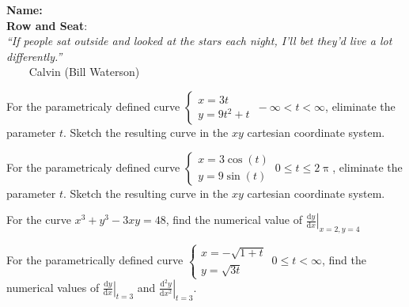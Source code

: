 \documentclass[12pt,fleqn]{exam}
\newcommand{\class}{MATH 202, Fall \the\year}
\begin{document}
\large
\noindent\makebox[3.0truein][l]{\textbf{\class}}
\textbf{Name:} \hrulefill \\
\noindent {}
\textbf{Row and Seat}:\hrulefill\\





\noindent \emph{“If people sat outside and looked at 
the stars each night, I’ll bet they’d live a lot differently.”}\\
  $\phantom{xxx}$ \hfill {\sc Calvin (Bill Waterson)}


\begin{questions} 
    
  
\question For the parametricaly defined curve $\begin{cases}
      x = 3 t \\ y = 9 t^2 + t \end{cases} \, -\infty < t < \infty$,
      eliminate the parameter $t$. Sketch the resulting curve in
      the $xy$ cartesian coordinate system.

\begin{solution}[2.5in]
\end{solution}

\question For the parametricaly defined curve $\begin{cases}
    x = 3 \cos(t) \\ y = 9 \sin(t) \end{cases} \, 0 \leq  t \leq 2 \uppi$,
    eliminate the parameter $t$. Sketch the resulting curve in
    the $xy$ cartesian coordinate system.

\begin{solution}%
\end{solution}

\newpage


\question For the curve $x^3 + y^3 - 3 x y = 48$, find the 
numerical value of $\displaystyle 
\left . \frac{\mathrm{d} y}{\mathrm{d}x} \right |_{x=2,y=4}$
\begin{solution}[3.5in]
\end{solution}

\question For the parametrically defined curve 
$\displaystyle \begin{cases} x = -\sqrt{1+t} \\ y = \sqrt{3t} 
\end{cases} \, 0 \leq t < \infty$, find the numerical values 
of $\left . \frac{\mathrm{d} y}{\mathrm{d}x} \right |_{t=3}$
and $\left . \frac{\mathrm{d}^2 y}{\mathrm{d} x^2} \right |_{t=3}$.


\end{questions}
\end{document}
